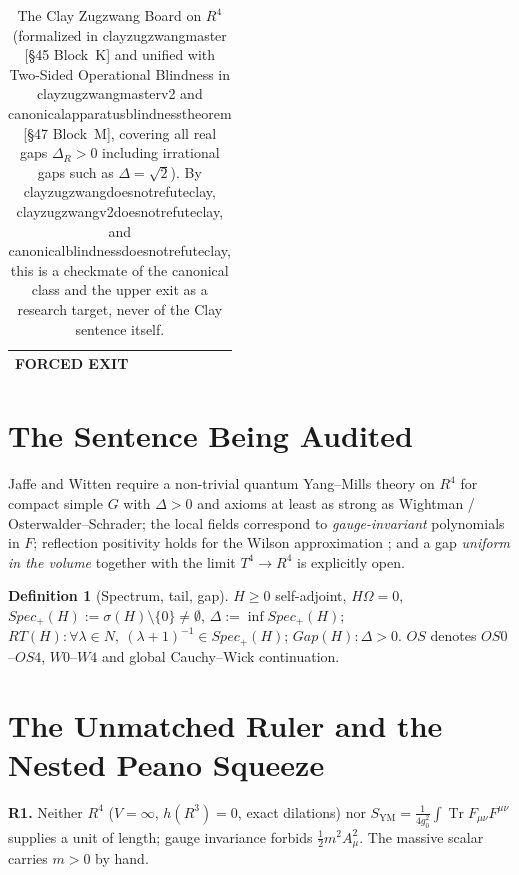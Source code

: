 \documentclass[11pt,a4paper]{article}
\def\R{R}\def\N{N}\def\Q{Q}\def\Z{Z}\def\Class{C}\def\OS{OS}\def\Gap{Gap}%
\def\RT{RT}\def\Obstr{Obstr}\def\Spec{Spec}\def\Htot{H}\def\Chit{chi-t}\def\Lean#1{#1}}
\theoremstyle{plain}
\theoremstyle{definition}
\newtheorem{definition}[theorem]{Definition}
\theoremstyle{remark}
\newcommand{\R}{\mathbb{R}}\newcommand{\N}{\mathbb{N}}\newcommand{\Q}{\mathbb{Q}}
\newcommand{\Z}{\mathbb{Z}}\newcommand{\Spec}{\operatorname{Spec}}
\newcommand{\OS}{\mathrm{OS}}\newcommand{\Gap}{\mathrm{Gap}}
\newcommand{\Obstr}{\mathrm{Obstr}}\newcommand{\RT}{\mathrm{RT}}
\newcommand{\Class}{\mathcal{C}}\newcommand{\Htot}{\mathcal{H}}
\newcommand{\Chit}{\chi_t}
\renewcommand{\_}{\oldunderscore\allowbreak}
\newcommand{\Lean}[1]{\texttt{\small #1}}
\begin{document}
\begin{table}[htbp]
\begin{tabularx}{\textwidth}{p{4.3cm} X p{2.7cm}}
\textbf{\color{accentblue}FORCED EXIT}\\
\bottomrule
\end{tabularx}
\caption{The Clay Zugzwang Board on $\R^4$ (formalized in \Lean{clay\_zugzwang\_master} [\S45 Block~K] and unified with Two-Sided Operational Blindness in \Lean{clay\_zugzwang\_master\_v2} and \Lean{canonical\_apparatus\_blindness\_theorem} [\S47 Block~M], covering all real gaps $\Delta_\R>0$ including irrational gaps such as $\Delta=\sqrt{2}$). By \Lean{clay\_zugzwang\_does\_not\_refute\_clay}, \Lean{clay\_zugzwang\_v2\_does\_not\_refute\_clay}, and \Lean{canonical\_blindness\_does\_not\_refute\_clay}, this is a checkmate of the canonical class and the upper exit as a research target, never of the Clay sentence itself.}
\label{tab:zugzwang}
\end{table}

\section{The Sentence Being Audited}
Jaffe and Witten \cite{JaffeWitten2000} require a non-trivial quantum Yang--Mills theory on $\R^4$
for compact simple $G$ with $\Delta>0$ and axioms at least as strong as Wightman /
Osterwalder--Schrader; the local fields correspond to \emph{gauge-invariant} polynomials in $F$;
reflection positivity holds for the Wilson approximation \cite{OsterwalderSeiler1978}; and a gap
\emph{uniform in the volume} together with the limit $T^4\to\R^4$ is explicitly open.
\begin{definition}[Spectrum, tail, gap]\label{def:spec}
$H\ge0$ self-adjoint, $H\Omega=0$, $\Spec_+(H):=\sigma(H)\setminus\{0\}\neq\emptyset$,
$\Delta:=\inf\Spec_+(H)$; $\RT(H):\forall\lambda\in\N,\ (\lambda+1)^{-1}\in\Spec_+(H)$;
$\Gap(H):\Delta>0$. $\OS$ denotes $\OS0$--$\OS4$, $W0$--$W4$ and global Cauchy--Wick continuation.
\end{definition}
\section{The Unmatched Ruler and the Nested Peano Squeeze}\label{sub:ruler}
\textbf{R1.} Neither $\R^4$ ($V=\infty$, $h(\R^3)=0$, exact dilations) nor
$S_{\mathrm{YM}}=\frac1{4g_0^2}\int\operatorname{Tr}F_{\mu\nu}F^{\mu\nu}$ supplies a unit of
length; gauge invariance forbids $\tfrac12m^2A_\mu^2$. The massive scalar carries $m>0$ by hand.
\end{document}
